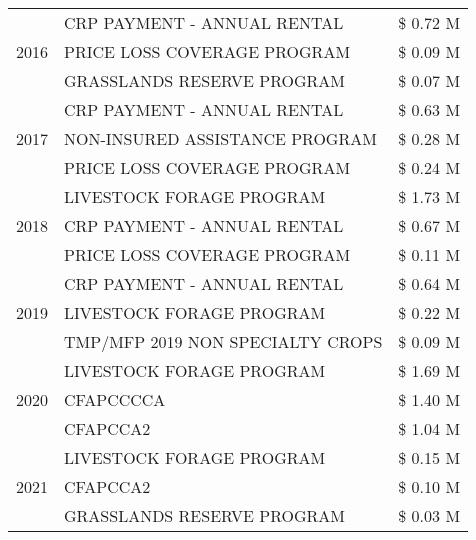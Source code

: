 \begin{tabular}{llr}
\cline{1-3}
\multirow[t]{3}{*}{2016} & CRP PAYMENT - ANNUAL RENTAL                   & \$ 0.72 M \\
 & PRICE LOSS COVERAGE PROGRAM                   & \$ 0.09 M \\
 & GRASSLANDS RESERVE PROGRAM                    & \$ 0.07 M \\
\cline{1-3}
\multirow[t]{3}{*}{2017} & CRP PAYMENT - ANNUAL RENTAL & \$ 0.63 M \\
 & NON-INSURED ASSISTANCE PROGRAM & \$ 0.28 M \\
 & PRICE LOSS COVERAGE PROGRAM & \$ 0.24 M \\
\cline{1-3}
\multirow[t]{3}{*}{2018} & LIVESTOCK FORAGE PROGRAM & \$ 1.73 M \\
 & CRP PAYMENT - ANNUAL RENTAL & \$ 0.67 M \\
 & PRICE LOSS COVERAGE PROGRAM & \$ 0.11 M \\
\cline{1-3}
\multirow[t]{3}{*}{2019} & CRP PAYMENT - ANNUAL RENTAL & \$ 0.64 M \\
 & LIVESTOCK FORAGE PROGRAM & \$ 0.22 M \\
 & TMP/MFP 2019 NON SPECIALTY CROPS & \$ 0.09 M \\
\cline{1-3}
\multirow[t]{3}{*}{2020} & LIVESTOCK FORAGE PROGRAM & \$ 1.69 M \\
 & CFAPCCCCA & \$ 1.40 M \\
 & CFAPCCA2 & \$ 1.04 M \\
\cline{1-3}
\multirow[t]{3}{*}{2021} & LIVESTOCK FORAGE PROGRAM & \$ 0.15 M \\
 & CFAPCCA2 & \$ 0.10 M \\
 & GRASSLANDS RESERVE PROGRAM & \$ 0.03 M \\
\cline{1-3}
\bottomrule
\end{tabular}
